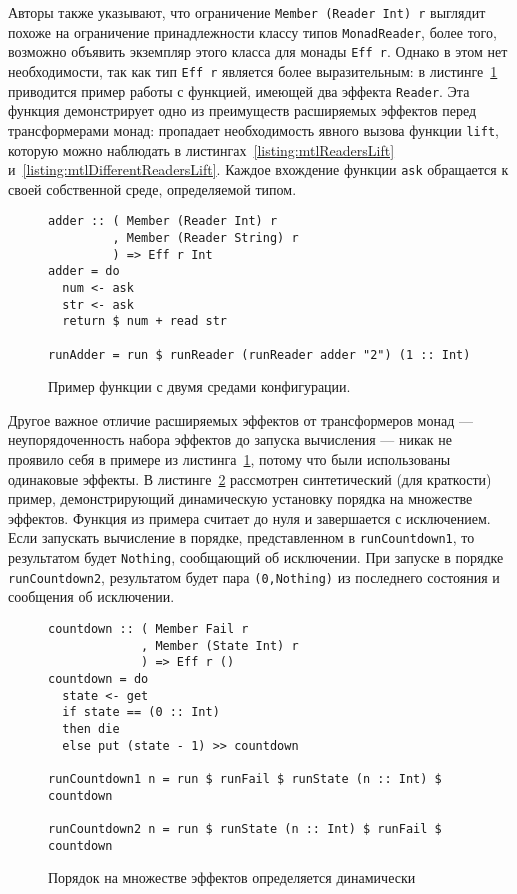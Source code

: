 Авторы также указывают, что ограничение 
\mbox{\lstinline{Member (Reader Int) r}} выглядит похоже на ограничение 
принадлежности классу типов \lstinline{MonadReader}, более того, возможно 
объявить экземпляр этого класса для монады \lstinline{Eff r}. Однако в этом нет
необходимости, так как тип \lstinline{Eff r} является более выразительным: 
в листинге~\ref{listing:extEff2Readers} приводится пример работы с функцией, 
имеющей два эффекта \lstinline{Reader}. Эта функция демонстрирует одно из 
преимуществ расширяемых эффектов перед трансформерами монад: пропадает 
необходимость явного вызова функции \lstinline{lift}, которую можно наблюдать 
в листингах~\ref{listing:mtlReadersLift} 
и~\ref{listing:mtlDifferentReadersLift}. Каждое вхождение функции 
\lstinline{ask} обращается к своей собственной среде, определяемой типом.

\begin{figure}[t]
\begin{lstlisting}
adder :: ( Member (Reader Int) r
         , Member (Reader String) r
         ) => Eff r Int
adder = do
  num <- ask
  str <- ask
  return $ num + read str

runAdder = run $ runReader (runReader adder "2") (1 :: Int)
\end{lstlisting}
\caption{Пример функции с двумя средами конфигурации.}
\label{listing:extEff2Readers}
\end{figure}

Другое важное отличие расширяемых эффектов от трансформеров монад --- 
неупорядоченность набора эффектов до запуска вычисления --- никак не проявило 
себя в примере из листинга~\ref{listing:extEff2Readers}, потому что были 
использованы одинаковые эффекты. В листинге~\ref{listing:extEffOrdering} 
рассмотрен синтетический (для краткости) пример, демонстрирующий динамическую 
установку порядка на множестве эффектов. Функция из примера считает до нуля и 
завершается с исключением. Если запускать вычисление в порядке, представленном 
в \lstinline{runCountdown1}, то результатом будет \lstinline{Nothing}, 
сообщающий об исключении. При запуске в порядке \lstinline{runCountdown2}, 
результатом будет пара \lstinline{(0,Nothing)} из последнего состояния и 
сообщения об исключении.

\begin{figure}[t]
\begin{lstlisting}
countdown :: ( Member Fail r
             , Member (State Int) r
             ) => Eff r ()
countdown = do
  state <- get
  if state == (0 :: Int)
  then die
  else put (state - 1) >> countdown

runCountdown1 n = run $ runFail $ runState (n :: Int) $ countdown

runCountdown2 n = run $ runState (n :: Int) $ runFail $ countdown
\end{lstlisting}
\caption{Порядок на множестве эффектов определяется динамически}
\label{listing:extEffOrdering}
\end{figure}

